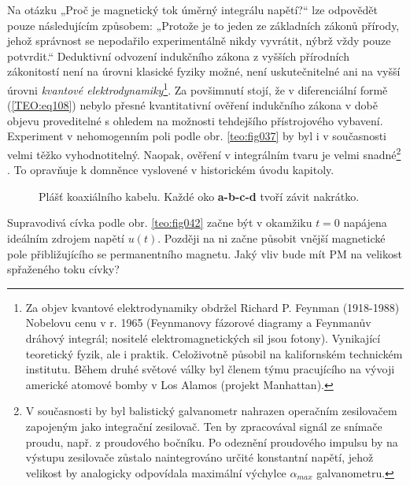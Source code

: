     Na otázku „Proč je magnetický tok úměrný integrálu napětí?“ lze odpovědět pouze následujícím
    způsobem: „Protože je to jeden ze základních zákonů přírody, jehož správnost se nepodařilo
    experimentálně nikdy vyvrátit, nýbrž vždy pouze potvrdit.“ Deduktivní odvození indukčního zákona
    z vyšších přírodních zákonitostí není na úrovni klasické fyziky možné, není uskutečnitelné ani
    na vyšší úrovni \emph{kvantové elektrodynamiky}\footnote{Za objev kvantové elektrodynamiky
    obdržel Richard P. Feynman (1918-1988) Nobelovu cenu v r. 1965 (Feynmanovy fázorové diagramy a
    Feynmanův dráhový integrál; nositelé elektromagnetických sil jsou fotony). Vynikající teoretický
    fyzik, ale i praktik. Celoživotně působil na kalifornském technickém institutu. Během druhé
    světové války byl členem týmu pracujícího na vývoji americké atomové bomby v Los Alamos (projekt
    Manhattan).}. Za povšimnutí stojí, že v diferenciální formě (\ref{TEO:eq108}) nebylo přesné
    kvantitativní ověření indukčního zákona v době objevu proveditelné s ohledem na možnosti
    tehdejšího přístrojového vybavení. Experiment v nehomogenním poli podle obr. \ref{teo:fig037} by
    byl i v současnosti velmi těžko vyhodnotitelný. Naopak, ověření v integrálním tvaru je velmi
    snadné\footnote{V současnosti by byl balistický galvanometr nahrazen operačním zesilovačem
    zapojeným jako integrační zesilovač. Ten by zpracovával signál ze snímače proudu, např. z
    proudového bočníku. Po odeznění proudového impulsu by na výstupu zesilovače zůstalo
    naintegrováno určité konstantní napětí, jehož velikost by analogicky odpovídala maximální
    výchylce \(\alpha_{max}\) galvanometru.} . To opravňuje k domněnce vyslovené v historickém úvodu
    kapitoly.

    \begin{figure}[ht!]
      \centering  
      \caption{Plášť koaxiálního kabelu. Každé oko \textbf{a-b-c-d} tvoří závit nakrátko.} 
      \label{teo:fig041}
    \end{figure}
      
    Supravodivá cívka podle obr. \ref{teo:fig042} začne být v okamžiku \(t = 0\)
    napájena ideálním zdrojem napětí \(u(t)\). Později na ni začne působit vnější magnetické pole
    přibližujícího se permanentního magnetu. Jaký vliv bude mít PM na velikost spřaženého toku
    cívky?
    
